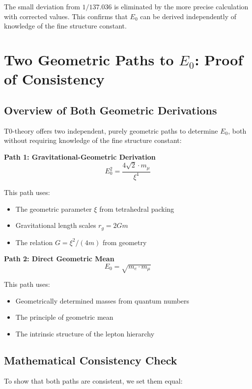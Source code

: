 	The small deviation from $1/137.036$ is eliminated by the more precise calculation with corrected values. This confirms that $E_0$ can be derived independently of knowledge of the fine structure constant.
	
	\section{Two Geometric Paths to $E_0$: Proof of Consistency}
	
	\subsection{Overview of Both Geometric Derivations}
	
	T0-theory offers two independent, purely geometric paths to determine $E_0$, both without requiring knowledge of the fine structure constant:
	
	\textbf{Path 1: Gravitational-Geometric Derivation}
	\begin{equation}
		E_0^2 = \frac{4\sqrt{2} \cdot m_\mu}{\xi^4}
	\end{equation}
	
	This path uses:
	\begin{itemize}
		\item The geometric parameter $\xi$ from tetrahedral packing
		\item Gravitational length scales $r_g = 2Gm$
		\item The relation $G = \xi^2/(4m)$ from geometry
	\end{itemize}
	
	\textbf{Path 2: Direct Geometric Mean}
	\begin{equation}
		E_0 = \sqrt{m_e \cdot m_\mu}
	\end{equation}
	
	This path uses:
	\begin{itemize}
		\item Geometrically determined masses from quantum numbers
		\item The principle of geometric mean
		\item The intrinsic structure of the lepton hierarchy
	\end{itemize}
	
	\subsection{Mathematical Consistency Check}
	
	To show that both paths are consistent, we set them equal:
	
